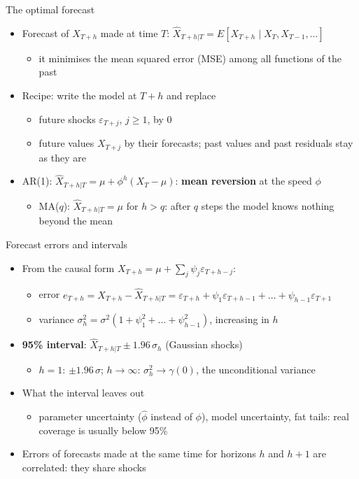 \begin{frame}{The optimal forecast}
\itemsize{\small}
\begin{itemize}
    \item Forecast of $X_{T+h}$ made at time $T$: $\hat X_{T+h|T} = E[X_{T+h} \mid X_T, X_{T-1}, \dots]$
    \begin{itemize}
        \item it minimises the mean squared error (MSE) among all functions of the past
    \end{itemize}
    \item Recipe: write the model at $T + h$ and replace
    \begin{itemize}
        \item future shocks $\varepsilon_{T+j}$, $j \ge 1$, by 0
        \item future values $X_{T+j}$ by their forecasts; past values and past residuals stay as they are
    \end{itemize}
    \item AR(1): $\hat X_{T+h|T} = \mu + \phi^h(X_T - \mu)$: \textbf{mean reversion} at the speed $\phi$
    \begin{itemize}
        \item MA($q$): $\hat X_{T+h|T} = \mu$ for $h > q$: after $q$ steps the model knows nothing beyond the mean
    \end{itemize}
\end{itemize}
\end{frame}

\begin{frame}{Forecast errors and intervals}
\itemsize{\small}
\begin{itemize}
    \item From the causal form $X_{T+h} = \mu + \sum_j\psi_j\varepsilon_{T+h-j}$:
    \begin{itemize}
        \item error $e_{T+h} = X_{T+h} - \hat X_{T+h|T} = \varepsilon_{T+h} + \psi_1\varepsilon_{T+h-1} + \dots + \psi_{h-1}\varepsilon_{T+1}$
        \item variance $\sigma_h^2 = \sigma^2(1 + \psi_1^2 + \dots + \psi_{h-1}^2)$, increasing in $h$
    \end{itemize}
    \item \textbf{95\% interval}: $\hat X_{T+h|T} \pm 1.96\,\sigma_h$ (Gaussian shocks)
    \begin{itemize}
        \item $h = 1$: $\pm 1.96\,\sigma$; $h \to \infty$: $\sigma_h^2 \to \gamma(0)$, the unconditional variance
    \end{itemize}
    \item What the interval leaves out
    \begin{itemize}
        \item parameter uncertainty ($\hat\phi$ instead of $\phi$), model uncertainty, fat tails: real coverage is usually below 95\%
    \end{itemize}
    \item Errors of forecasts made at the same time for horizons $h$ and $h + 1$ are correlated: they share shocks
\end{itemize}
\end{frame}

